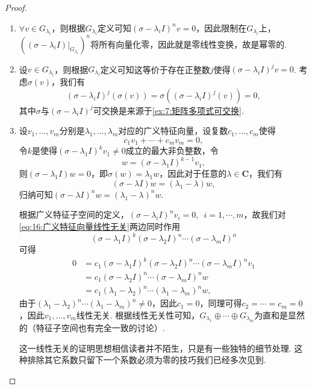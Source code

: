 \begin{proof}
    \begin{enumerate}
        \item $\forall v\in G_{\lambda_i}$，则根据$G_{\lambda_i}$定义可知$(\sigma-\lambda_i I)^nv=0$，因此限制在$G_{\lambda_i}$上，$((\sigma-\lambda_i I)\vert_{G_{\lambda_i}})^n$将所有向量化零，因此就是零线性变换，故是幂零的.

        \item 设$v\in G_{\lambda_i}$，则根据$G_{\lambda_i}$定义可知这等价于存在正整数$j$使得$(\sigma-\lambda_i I)^jv=0$. 考虑$\sigma(v)$，我们有
        \[(\sigma-\lambda_i I)^j(\sigma(v))=\sigma((\sigma-\lambda_i I)^j(v))=0,\]
        其中$\sigma$与$(\sigma-\lambda_i I)^j$可交换是来源于\autoref{ex:7:矩阵多项式可交换}.

        \item 设$v_1,\ldots,v_m$分别是$\lambda_1,\ldots,\lambda_m$对应的广义特征向量，设复数$c_1,\ldots,c_m$使得
        \begin{equation} \label{eq:16:广义特征向量线性无关}
            c_1v_1+\cdots+c_mv_m=0,
        \end{equation}
        令$k$是使得$(\sigma-\lambda_1 I)^kv_1\neq 0$成立的最大非负整数，令
        \[w=(\sigma-\lambda_1 I)^{k-1}v_1,\]
        则$(\sigma-\lambda_1 I)w=0$，即$\sigma(w)=\lambda_1w$，因此对于任意的$\lambda\in\mathbf{C}$，我们有
        \[(\sigma-\lambda I)w=(\lambda_1-\lambda)w,\]
        归纳可知$(\sigma-\lambda I)^nw=(\lambda_1-\lambda)^nw$.

        根据广义特征子空间的定义，$(\sigma-\lambda_i I)^nv_i=0,\enspace i=1,\cdots,m$，故我们对\autoref{eq:16:广义特征向量线性无关}两边同时作用
        \[(\sigma-\lambda_1 I)^k(\sigma-\lambda_2 I)^n\cdots(\sigma-\lambda_m I)^n\]
        可得
        \begin{align*}
            0 &= c_1(\sigma-\lambda_1 I)^k(\sigma-\lambda_2 I)^n\cdots(\sigma-\lambda_m I)^nv_1 \\
            &= c_1(\sigma-\lambda_2 I)^n\cdots(\sigma-\lambda_m I)^nw \\
            &= c_1(\lambda_1-\lambda_2)^n\cdots(\lambda_1-\lambda_m)^nw,
        \end{align*}
        由于$(\lambda_1-\lambda_2)^n\cdots(\lambda_1-\lambda_m)^n\neq 0$，因此$c_1=0$，同理可得$c_2=\cdots=c_m=0$，因此$v_1,\ldots,v_m$线性无关. 根据线性无关性可知，$G_{\lambda_1}\oplus\cdots\oplus G_{\lambda_m}$为直和是显然的（特征子空间也有完全一致的讨论）.

        这一线性无关的证明思想相信读者并不陌生，只是有一些独特的细节处理. 这种排除其它系数只留下一个系数必须为零的技巧我们已经多次见到.


\end{enumerate}
\end{proof}
